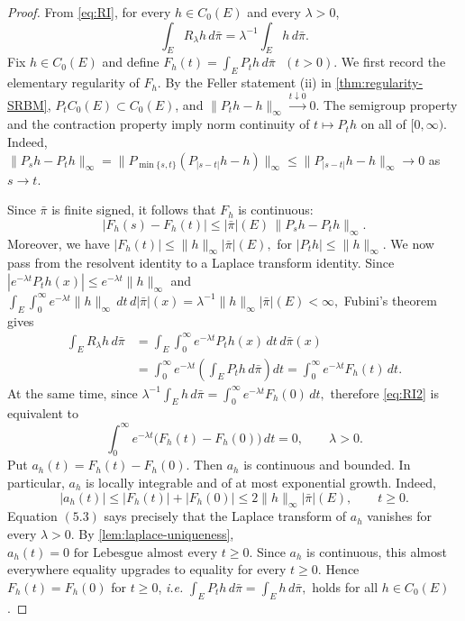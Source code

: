 \documentclass[aihp]{imsart}
\numberwithin{equation}{section}
\theoremstyle{plain}
\theoremstyle{definition}
\newcommand{\1}{\mathbf 1}
\begin{document}
\begin{proof}
From \eqref{eq:RI}, for every \(h\in C_0(E)\) and every \(\lambda>0\),
\begin{equation}\label{eq:RI2}
    \int_E R_\lambda h\,d\bar\pi
        =
        \lambda^{-1}\int_E h\,d\bar\pi .
\end{equation}
Fix \(h\in C_0(E)\) and define $F_h(t)
        =
        \int_E P_t h\,d\bar\pi \text{ }(t>0).$ We first record the elementary regularity of \(F_h\). By the Feller statement \textup{(ii)} in \cref{thm:regularity-SRBM}, \(P_tC_0(E)\subset C_0(E)\), and $\|P_t h-h\|_\infty\xrightarrow{t\downarrow0} 0.$ The semigroup property and the contraction property imply norm continuity of
\(t\mapsto P_t h\) on all of \([0,\infty)\). Indeed, $\|P_s h-P_t h\|_\infty
        =
        \|P_{\min\{s,t\}}(P_{|s-t|}h-h)\|_\infty
        \le
        \|P_{|s-t|}h-h\|_\infty
        \longrightarrow0$ as \(s\to t\).

Since \(\bar\pi\) is finite signed, it follows that \(F_h\) is continuous:
\[
        |F_h(s)-F_h(t)|
        \le
        |\bar\pi|(E)\,\|P_s h-P_t h\|_\infty .
\]
Moreover, we have $|F_h(t)|
        \le
        \|h\|_\infty |\bar\pi|(E),$ for \(|P_t h|\le\|h\|_\infty\). We now pass from the resolvent identity to a Laplace transform identity. Since
\(
        |e^{-\lambda t}P_t h(x)|
        \le
        e^{-\lambda t}\|h\|_\infty
\)
and
\(
        \int_E\int_0^\infty e^{-\lambda t}\|h\|_\infty\,dt\,d|\bar\pi|(x)
        =
        \lambda^{-1}\|h\|_\infty|\bar\pi|(E)
        <
        \infty,
\)
Fubini's theorem gives
\[
\begin{aligned}
        \int_E R_\lambda h\,d\bar\pi
        &=
        \int_E\int_0^\infty e^{-\lambda t}P_t h(x)\,dt\,d\bar\pi(x)  \\
        &=
        \int_0^\infty e^{-\lambda t}
        \left(\int_E P_t h\,d\bar\pi\right)dt                      =
        \int_0^\infty e^{-\lambda t}F_h(t)\,dt .
\end{aligned}
\]
At the same time, since $\lambda^{-1}\int_E h\,d\bar\pi
        =
        \int_0^\infty e^{-\lambda t}F_h(0)\,dt ,$ therefore \eqref{eq:RI2} is equivalent to
\[
        \int_0^\infty e^{-\lambda t}
        \bigl(F_h(t)-F_h(0)\bigr)\,dt
        =
        0,
        \qquad \lambda>0 .
\tag{5.3}
\]
Put $a_h(t)=F_h(t)-F_h(0).$ Then \(a_h\) is continuous and bounded. In particular, \(a_h\) is locally integrable and
of at most exponential growth. Indeed,
\[
        |a_h(t)|
        \le
        |F_h(t)|+|F_h(0)|
        \le
        2\|h\|_\infty|\bar\pi|(E),
        \qquad t\ge0 .
\]
Equation \((5.3)\) says precisely that the Laplace transform of \(a_h\) vanishes for
every \(\lambda>0\). By \cref{lem:laplace-uniqueness},
\(a_h(t)=0 \text{ for Lebesgue almost every }t\ge0 .\) Since \(a_h\) is continuous, this almost everywhere equality upgrades to equality for
every \(t\ge0\). Hence $F_h(t)=F_h(0)$ for $t\ge 0$, \emph{i.e.} $\int_E P_t h\,d\bar\pi
        =
        \int_E h\,d\bar\pi,$ holds for all  $h\in C_0(E)$. 
        

\end{proof}
\end{document}
